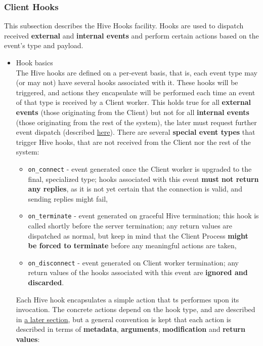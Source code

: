 \documentclass[a4paper]{article}
\begin{document}
\subsubsection{Client Hooks}
\label{sec-7-1-4}
\label{ref-client_hooks}

This subsection describes the Hive Hooks facility. Hooks are used to dispatch received \textbf{external} and \textbf{internal events} and perform certain actions based on the event's type and payload.
\begin{itemize}

\item Hook basics\\
\label{sec-7-1-4-1}%
The Hive hooks are defined on a per-event basis, that is, each event type may (or may not) have several hooks associated with it. These hooks will be triggered, and actions they encapsulate will be performed each time an event of that type is received by a Client worker. This holds true for all \textbf{external events} (those originating from the Client) but not for all \textbf{internal events} (those originating from the rest of the system), the later must request further event dispatch (described \hyperref[sec-9-3]{here}). There are several \textbf{special event types} that trigger Hive hooks, that are not received from the Client nor the rest of the system:


\begin{itemize}
\item \texttt{on\_connect} - event generated once the Client worker is upgraded to the final, specialized type; hooks associated with this event \textbf{must not return any replies}, as it is not yet certain that the connection is valid, and sending replies might fail,
\item \texttt{on\_terminate} - event generated on graceful Hive termination; this hook is called shortly before the server termination; any return values are dispatched as normal, but keep in mind that the Client Process \textbf{might be forced to terminate} before any meaningful actions are taken,
\item \texttt{on\_disconnect} - event generated on Client worker termination; any return values of the hooks associated with this event are \textbf{ignored and discarded}.
\end{itemize}

\noindent
Each Hive hook encapsulates a simple action that ts performes upon its invocation. The concrete actions depend on the hook type, and are described in \hyperref[sec-9-2]{a later section}, but a general convention is kept that each action is described in terms of \textbf{metadata}, \textbf{arguments}, \textbf{modification} and \textbf{return values}:



\end{itemize}
\end{document}
